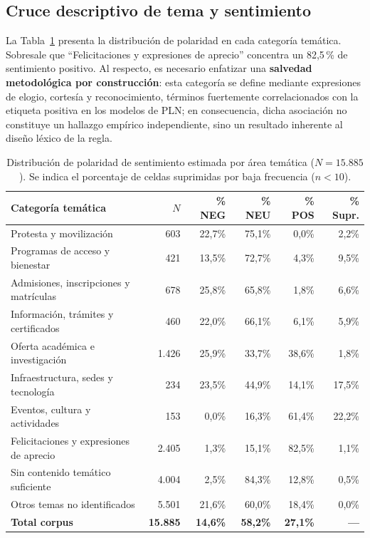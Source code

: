 \documentclass[conference]{IEEEtran}
\newcommand{\pc}{\,\%}
\begin{document}
\subsection{Cruce descriptivo de tema y sentimiento}
La Tabla~\ref{tab:tema_sentimiento_actualizado} presenta la distribuci\'on de polaridad en cada categor\'ia tem\'atica. Sobresale que ``Felicitaciones y expresiones de aprecio'' concentra un 82,5\pc{} de sentimiento positivo. Al respecto, es necesario enfatizar una \textbf{salvedad metodol\'ogica por construcci\'on}: esta categor\'ia se define mediante expresiones de elogio, cortes\'ia y reconocimiento, t\'erminos fuertemente correlacionados con la etiqueta positiva en los modelos de PLN; en consecuencia, dicha asociaci\'on no constituye un hallazgo emp\'irico independiente, sino un resultado inherente al dise\~no léxico de la regla.

\begin{table}[!t]
\centering
\footnotesize
\caption{Distribuci\'on de polaridad de sentimiento estimada por \'area tem\'atica ($N = 15.885$). Se indica el porcentaje de celdas suprimidas por baja frecuencia ($n < 10$).}
\label{tab:tema_sentimiento_actualizado}
\begin{tabular}{@{}p{}rrrrr@{}}
\toprule
\textbf{Categor\'ia tem\'atica} & \textbf{$N$} & \textbf{\% NEG} & \textbf{\% NEU} & \textbf{\% POS} & \textbf{\% Supr.} \\
\midrule
Protesta y movilizaci\'on & 603 & 22,7\% & 75,1\% & 0,0\% & 2,2\% \\
Programas de acceso y bienestar & 421 & 13,5\% & 72,7\% & 4,3\% & 9,5\% \\
Admisiones, inscripciones y matr\'iculas & 678 & 25,8\% & 65,8\% & 1,8\% & 6,6\% \\
Informaci\'on, tr\'amites y certificados & 460 & 22,0\% & 66,1\% & 6,1\% & 5,9\% \\
Oferta acad\'emica e investigaci\'on & 1.426 & 25,9\% & 33,7\% & 38,6\% & 1,8\% \\
Infraestructura, sedes y tecnolog\'ia & 234 & 23,5\% & 44,9\% & 14,1\% & 17,5\% \\
Eventos, cultura y actividades & 153 & 0,0\% & 16,3\% & 61,4\% & 22,2\% \\
Felicitaciones y expresiones de aprecio & 2.405 & 1,3\% & 15,1\% & 82,5\% & 1,1\% \\
\midrule
Sin contenido tem\'atico suficiente & 4.004 & 2,5\% & 84,3\% & 12,8\% & 0,5\% \\
Otros temas no identificados & 5.501 & 21,6\% & 60,0\% & 18,4\% & 0,0\% \\
\midrule
\textbf{Total corpus} & \textbf{15.885} & \textbf{14,6\%} & \textbf{58,2\%} & \textbf{27,1\%} & \textbf{---} \\
\bottomrule
\end{tabular}
\end{table}
\end{document}
